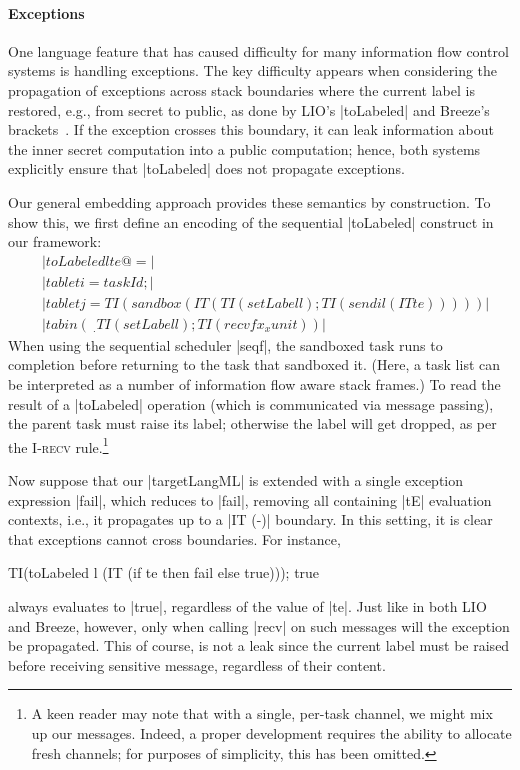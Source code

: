 \paragraph{Exceptions}  One language feature that has caused difficulty for
many information flow control systems is handling exceptions.
%
The key difficulty appears when considering the propagation of exceptions
across stack boundaries where the current label is restored, e.g., from secret
to public, as done by LIO's |toLabeled| and Breeze's
brackets~\cite{Hritcu:2013:YIB:2497621.2498098, stefan:2012:arxiv-flexible}.
%
If the exception crosses this boundary, it can leak information about the
inner secret computation into a public computation; hence, both systems
explicitly ensure that |toLabeled| does not propagate exceptions.

Our general embedding approach provides these semantics by construction.
%
To show this, we first define an encoding of the sequential |toLabeled|
construct in our framework:
\begin{align*}
    & |toLabeled l te @= | \\
    & |tab let i = taskId; | \\
    & |tab let j = TI (sandbox (IT (TI (setLabel l); TI (send i l (IT te)))))| \\
    & |tab in (\ _ . TI (setLabel l); TI (recvf x _ x unit))|
\end{align*}
When using the sequential scheduler |seqf|, the sandboxed task runs to
completion before returning to the task that sandboxed it. 
(Here, a task list can be interpreted as a number of information flow aware
stack frames.)
To read the result of a |toLabeled| operation
(which is communicated via message passing), the parent task must raise
its label; otherwise the label will get dropped, as per the \textsc{I-recv}
rule.\footnote{A keen reader may note that with a single, per-task channel, we
might mix up our messages.  Indeed, a proper development requires the ability
to allocate fresh channels; for purposes of simplicity, this has been omitted.}

Now suppose that our |targetLangML| is extended with a single exception
expression |fail|, which reduces to |fail|, removing all containing |tE|
evaluation contexts, i.e., it propagates up to a |IT (-)| boundary.
%
In this setting, it is clear that exceptions cannot cross boundaries.
%
For instance, 
\begin{code}
TI(toLabeled l (IT (if te then fail else true))); true
\end{code}
always evaluates to |true|, regardless of the value of |te|.
%
Just like in both LIO and Breeze, however, only when calling |recv| on such messages
will the exception be propagated.
%
This of course, is not a leak since the current label must be raised before
receiving sensitive message, regardless of their content.


